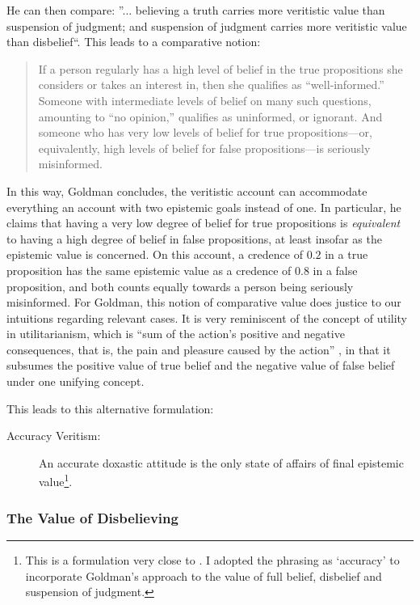 \documentclass[12pt,numbers=noenddot]{scrartcl}
\begin{document}
He can then compare: ”... believing a truth carries more veritistic value than suspension of judgment; and suspension of judgment carries more veritistic value than disbelief“. This leads to a comparative notion:

\begin{quote}
    If a person regularly has a high level of belief in the true propositions she considers or takes an interest in, then she qualifies as “well‐informed.” Someone with intermediate levels of belief on many such questions, amounting to “no opinion,” qualifies as uninformed, or ignorant. And someone who has very low levels of belief for true propositions—or, equivalently, high levels of belief for false propositions—is seriously misinformed. \autocite[58]{Goldman2002-GOLTUO-2}
\end{quote}

In this way, Goldman concludes, the veritistic account can accommodate everything an account with two epistemic goals instead of one. In particular, he claims that having a very low degree of belief for true propositions is \emph{equivalent} to having a high degree of belief in false propositions, at least insofar as the epistemic value is concerned. On this account, a credence of $0.2$ in a true proposition has the same epistemic value as a credence of $0.8$ in a false proposition, and both counts equally towards a person being seriously misinformed. For Goldman, this notion of comparative value does justice to our intuitions regarding relevant cases. It is very reminiscent of the concept of utility in utilitarianism, which is “sum of the action's positive and negative consequences, that is, the pain and pleasure caused by the action” \autocite{depaul_value_2001}, in that it subsumes the positive value of true belief and the negative value of false belief under one unifying concept.

This leads to this alternative formulation:
\begin{description}
    \item[Accuracy Veritism:] An accurate doxastic attitude is the only state of affairs of final epistemic value\footnote{This is a formulation very close to \textcite[9]{Pettigrew2016-PETAAT-7}. I adopted the phrasing as ‘accuracy’ to incorporate Goldman's approach to the value of full belief, disbelief and suspension of judgment.}.
\end{description}

\subsubsection{The Value of Disbelieving}
\end{document}
